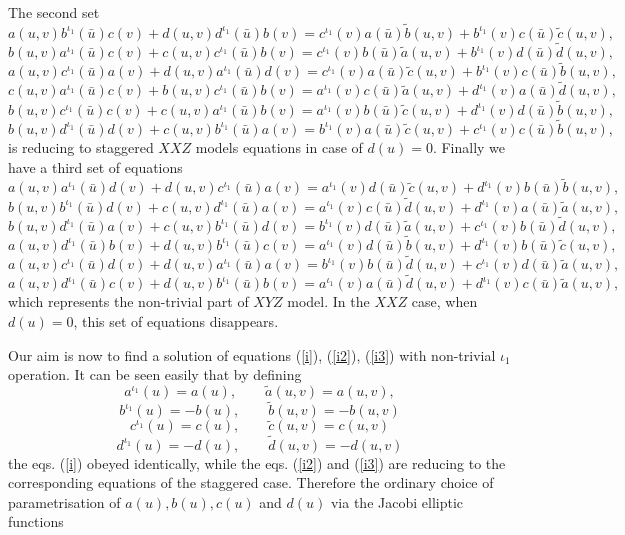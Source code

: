 \documentclass[a4paper,11pt]{article}
\begin{document}
The second set
$$
a(u,v)b^{\iota_1}(\bar u)c(v)+d(u,v)d^{\iota_1}(\bar u)b(v)=
c^{\iota_1}(v)a(\bar u)\tilde b(u,v)+b^{\iota_1}(v)c(\bar u)\tilde c(u,v),   
$$
$$ 
b(u,v)a^{\iota_1}(\bar u)c(v)+c(u,v)c^{\iota_1}(\bar u)b(v)=
c^{\iota_1}(v)b(\bar u)\tilde a(u,v)+b^{\iota_1}(v)d(\bar u)\tilde d(u,v),
$$
$$ 
a(u,v)c^{\iota_1}(\bar u)a(v)+d(u,v)a^{\iota_1}(\bar u)d(v)=
c^{\iota_1}(v)a(\bar u)\tilde c(u,v)+b^{\iota_1}(v)c(\bar u)\tilde b(u,v),
$$
\begin{equation}
\label{i2} 
c(u,v)a^{\iota_1}(\bar u)c(v)+b(u,v)c^{\iota_1}(\bar u)b(v)=
a^{\iota_1}(v)c(\bar u)\tilde a(u,v)+d^{\iota_1}(v)a(\bar u)\tilde d(u,v),
\end{equation}
$$ 
b(u,v)c^{\iota_1}(\bar u)c(v)+c(u,v)a^{\iota_1}(\bar u)b(v)=
a^{\iota_1}(v)b(\bar u)\tilde c(u,v)+d^{\iota_1}(v)d(\bar u)\tilde b(u,v),
$$
$$ 
b(u,v)d^{\iota_1}(\bar u)d(v)+c(u,v)b^{\iota_1}(\bar u)a(v)=
b^{\iota_1}(v)a(\bar u)\tilde c(u,v)+c^{\iota_1}(v)c(\bar u)\tilde b(u,v),
$$
is reducing to staggered $XXZ$ models equations \cite{APSS}
in case of $d(u)=0$. 
Finally we have a third set of equations
$$ 
a(u,v)a^{\iota_1}(\bar u)d(v)+d(u,v)c^{\iota_1}(\bar u)a(v)=
a^{\iota_1}(v)d(\bar u)\tilde c(u,v)+d^{\iota_1}(v)b(\bar u)\tilde b(u,v),
$$
$$ 
b(u,v)b^{\iota_1}(\bar u)d(v)+c(u,v)d^{\iota_1}(\bar u)a(v)=
a^{\iota_1}(v)c(\bar u)\tilde d(u,v)+d^{\iota_1}(v)a(\bar u)\tilde a(u,v),
$$
$$ 
b(u,v)d^{\iota_1}(\bar u)a(v)+c(u,v)b^{\iota_1}(\bar u)d(v)=
b^{\iota_1}(v)d(\bar u)\tilde a(u,v)+c^{\iota_1}(v)b(\bar u)\tilde d(u,v),
$$
\begin{equation}
\label{i3}
a(u,v)d^{\iota_1}(\bar u)b(v)+d(u,v)b^{\iota_1}(\bar u)c(v)=
a^{\iota_1}(v)d(\bar u)\tilde b(u,v)+d^{\iota_1}(v)b(\bar u)\tilde c(u,v),
\end{equation}
$$ 
a(u,v)c^{\iota_1}(\bar u)d(v)+d(u,v)a^{\iota_1}(\bar u)a(v)=
b^{\iota_1}(v)b(\bar u)\tilde d(u,v)+c^{\iota_1}(v)d(\bar u)\tilde a(u,v),
$$
$$ 
a(u,v)d^{\iota_1}(\bar u)c(v)+d(u,v)b^{\iota_1}(\bar u)b(v)=
a^{\iota_1}(v)a(\bar u)\tilde d(u,v)+d^{\iota_1}(v)c(\bar u)\tilde a(u,v),
$$
which represents the non-trivial part of $XYZ$ model. In
the $XXZ$ case, when $d(u)=0$, this set of equations disappears.

Our aim is now to find a solution of equations (\ref{i}), (\ref{i2}), 
(\ref{i3}) with non-trivial $\iota_1$ operation. 
It can be seen easily that by defining
$$
a^{\iota_1}(u)=a(u),\qquad \tilde a(u,v)=a(u,v),
$$
\begin{equation}
\label{1t}
b^{\iota_1}(u)=-b(u),\qquad \tilde b(u,v)=-b(u,v)
\end{equation}
$$
c^{\iota_1}(u)=c(u),\qquad \tilde c(u,v)=c(u,v)
$$
$$
d^{\iota_1}(u)=-d(u),\qquad \tilde d(u,v)=-d(u,v)
$$
the eqs. (\ref{i}) obeyed identically, while the eqs. 
(\ref{i2}) and (\ref{i3}) are reducing to the corresponding equations of 
the staggered case. Therefore the ordinary choice of parametrisation
of $a(u), b(u), c(u)$ and $d(u)$ via the Jacobi elliptic
functions 
\end{document}
